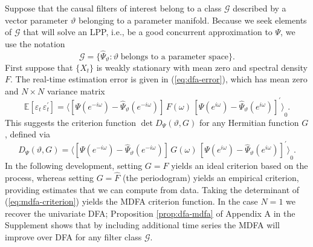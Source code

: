 \documentclass[a4paper]{book}
\def\EE{\mathbb E}
\begin{document}
Suppose that the causal filters of interest belong to a class
  $\mathcal{G}$  described by a vector parameter $\vartheta$ belonging to a 
 parameter manifold.  Because we seek elements of $\mathcal{G}$ that will solve
 an LPP, i.e., be a good concurrent approximation to $\Psi $, we use the notation
\begin{equation}
 \label{eq:filter-set}
 \mathcal{G} = \{
 \widehat{\Psi}_{\vartheta}   : \vartheta \; \mbox{belongs to a
  parameter space} \}.
\end{equation}
  First suppose that $\{ X_t \}$ is weakly stationary with mean zero and spectral density $F$.
  The real-time estimation error is given in (\ref{eq:dfa-error}),
 which has mean zero and $N \times N$ variance matrix
\begin{equation}
 \label{eq:dfa-mvar}
   \EE [ \varepsilon_t \, \varepsilon_t^{\prime} ]  = { \langle  \left[ \Psi ( e^{-i \omega} ) -  \widehat{\Psi}_{\vartheta} (e^{-i \omega}) \right] \, 
  F (\omega) \,
  {  \left[ \Psi (e^{i \omega}) -  \widehat{\Psi}_{\vartheta} (e^{i \omega}) \right] }^{\prime} \rangle }_0.
\end{equation}
   This suggests the criterion function  $\det D_{\Psi} (\vartheta, G)$ for
 any Hermitian function $G$, defined via
\begin{equation}
\label{eq:mdfa-criterion}
 D_{\Psi} (\vartheta, G) = { \langle  \left[ \Psi (e^{-i \omega}) - 
  \widehat{\Psi}_{\vartheta} (e^{-i \omega}) \right] \,   G (\omega) \,
  {  \left[ \Psi (e^{i \omega}) -  \widehat{\Psi}_{\vartheta} (e^{i \omega}) \right] }^{\prime} \rangle }_0.
\end{equation}
  In the following development, setting $G = F$ yields an ideal criterion based on the process,
 whereas setting $G =  \widehat{F}$ (the periodogram) yields an empirical criterion, providing estimates
 that we can compute from data.  
 Taking the determinant of (\ref{eq:mdfa-criterion}) yields
 the MDFA criterion function.  
 In the case $N=1$ we recover the univariate DFA; Proposition \ref{prop:dfa-mdfa} of Appendix A in the Supplement shows
that by including additional time series the MDFA will  improve over DFA for any filter class $\mathcal{G}$.
\end{document}
